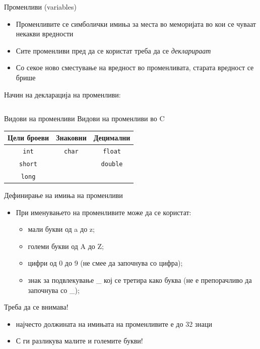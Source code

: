 \begin{frame}{Променливи (variables)}
\begin{itemize}
\item Променливите се симболички имиња за места во меморијата во кои се чуваат некакви вредности
\item Сите променливи пред да се користат треба да се \emph{декларираат}
\item Со секое ново сместување на вредност во променливата, старата вредност се брише
\end{itemize}

Начин на декларација на променливи:
\linebreak
\begin{columns}
		 
		 
		 \fbox{ = }
		 
		 \fbox{ ; }
\end{columns}	

\end{frame}

\begin{frame}{Видови на променливи}
\Large{Видови на променливи во C}
\linebreak
\linebreak
\begin{tabular}{c|c|c}
\textbf{Цели броеви} & \textbf{Знаковни} & \textbf{Децимални}\\
\hline
\texttt{int} & \texttt{char} & \texttt{float} \\
\hline
\texttt{short} & & \texttt{double} \\
\hline
\texttt{long} & &
\end{tabular}
\end{frame}

\begin{frame}{Дефинирање на имиња на променливи}
\begin{itemize}
\item При именувањето на променливите може да се користат:
\begin{itemize}
\item мали букви од a до z;
\item големи букви од A до Z;
\item цифри од 0 до 9 (не смее да започнува со цифра);
\item знак за подвлекување \_ кој се третира како буква (не е препорачливо да започнува со \_);
\end{itemize}
\end{itemize}
\begin{alertblock}{Треба да се внимава!}
\begin{itemize}
\item најчесто должината на имињата на променливите е до 32 знаци
\item С ги разликува малите и големите букви!
\end{itemize}
\end{alertblock}
\end{frame}

